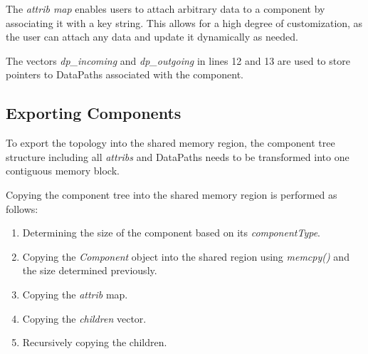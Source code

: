 The \emph{attrib map} enables users to attach arbitrary data to a component by associating it with a key string. This allows for a high degree of customization,
as the user can attach any data and update it dynamically as needed.

The vectors \emph{dp\_incoming} and \emph{dp\_outgoing} in lines 12 and 13 are used to store pointers to DataPaths associated with the component.

\subsection{Exporting Components}\label{subsection:export_components}
To export the topology into the shared memory region, the component tree structure including all \emph{attribs} and DataPaths needs to be transformed into one contiguous memory block.

Copying the component tree into the shared memory region is performed as follows:
\begin{enumerate}
    \item Determining the size of the component based on its \emph{componentType}.
    \item Copying the \emph{Component} object into the shared region using \emph{memcpy()} and the size determined previously.
    \item Copying the \emph{attrib} map.
    \item Copying the \emph{children} vector.
    \item Recursively copying the children.
\end{enumerate}

